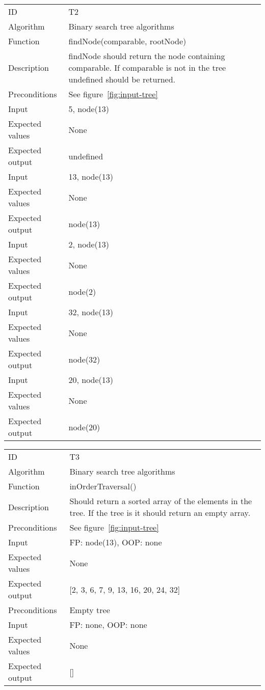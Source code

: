 \documentclass {article}
\begin{document}
\begin{tabular}{ | l p{10cm} | }
\hline
ID & T2 \\
Algorithm & Binary search tree algorithms \\
Function & findNode(comparable, rootNode) \\
Description & findNode should return the node containing comparable. If comparable is not in the tree undefined should be returned. \\
Preconditions & See figure~\ref{fig:input-tree} \\
Input & 5, node(13) \\
Expected values & None \\
Expected output & undefined \\
Input & 13, node(13) \\
Expected values & None \\
Expected output & node(13) \\
Input & 2, node(13) \\
Expected values & None \\
Expected output & node(2) \\
Input & 32, node(13) \\
Expected values & None \\
Expected output & node(32) \\
Input & 20, node(13) \\
Expected values & None \\
Expected output & node(20) \\
\hline
\end{tabular}

\begin{tabular}{ | l p{10cm} | }
\hline
ID & T3 \\
Algorithm & Binary search tree algorithms \\
Function & inOrderTraversal() \\
Description & Should return a sorted array of the elements in the tree. If the tree is it should return an empty array. \\
Preconditions & See figure~\ref{fig:input-tree} \\
Input & FP: node(13), OOP: none \\
Expected values & None \\
Expected output &  [2, 3, 6, 7, 9, 13, 16, 20, 24, 32] \\
Preconditions & Empty tree \\
Input & FP: none, OOP: none \\
Expected values & None \\
Expected output & [] \\
\hline
\end{tabular}
\end{document}
